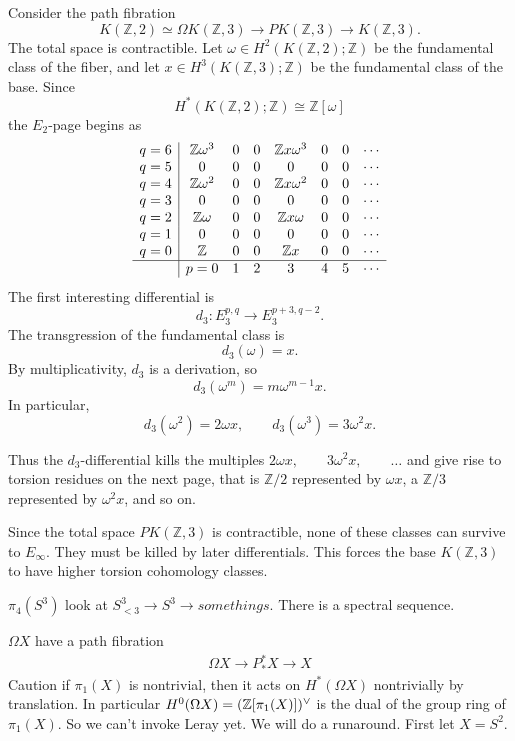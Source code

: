 \documentclass[12pt]{article}
\begin{document}
\begin{example}
Consider the path fibration
\[
K(\mathbb Z,2)\simeq \Omega K(\mathbb Z,3)
\longrightarrow
PK(\mathbb Z,3)
\longrightarrow
K(\mathbb Z,3).
\]
The total space is contractible. Let $\omega\in H^2(K(\mathbb Z,2);\mathbb Z)$
be the fundamental class of the fiber, and let $x\in H^3(K(\mathbb Z,3);\mathbb Z)$
be the fundamental class of the base. Since
\[
H^*(K(\mathbb Z,2);\mathbb Z)\cong \mathbb Z[\omega]
\]
the $E_2$-page begins as
\[
\begin{array}{c|ccccccc}
q=6 & \mathbb Z\omega^3 & 0 & 0 & \mathbb Zx\omega^3 & 0 & 0 & \cdots \\
q=5 & 0 & 0 & 0 & 0 & 0 & 0 & \cdots \\
q=4 & \mathbb Z\omega^2 & 0 & 0 & \mathbb Zx\omega^2 & 0 & 0 & \cdots \\
q=3 & 0 & 0 & 0 & 0 & 0 & 0 & \cdots \\
q=2 & \mathbb Z\omega & 0 & 0 & \mathbb Zx\omega & 0 & 0 & \cdots \\
q=1 & 0 & 0 & 0 & 0 & 0 & 0 & \cdots \\
q=0 & \mathbb Z & 0 & 0 & \mathbb Zx & 0 & 0 & \cdots \\
\hline
& p=0 & 1 & 2 & 3 & 4 & 5 & \cdots
\end{array}
\]
The first interesting differential is
\[
d_3:E_3^{p,q}\to E_3^{p+3,q-2}.
\]
The transgression of the fundamental class is
\[
d_3(\omega)=x.
\]
By multiplicativity, $d_3$ is a derivation, so
\[
d_3(\omega^m)=m\omega^{m-1}x.
\]
In particular,
\[
d_3(\omega^2)=2\omega x,
\qquad
d_3(\omega^3)=3\omega^2x.
\]

Thus the $d_3$-differential kills the multiples $2\omega x,\qquad 3\omega^2x,\qquad \dots$ and give rise to torsion residues on the next page, that is $\mathbb Z/2$ represented by $\omega x$, a $\mathbb Z/3$ represented by $\omega^2x$, and so on.

Since the total space $PK(\mathbb Z,3)$ is contractible, none of these classes can survive to $E_\infty$. They must be killed by later differentials. This forces the base $K(\mathbb Z,3)$
to have higher torsion cohomology classes. 
\end{example}

    $\pi_4(S^3)$ look at $S^3_{<3} \to S^3 \to somethings $. There is a spectral sequence.

    $\Omega X$ have a path fibration \begin{align*}
        \Omega X \to P^*_*X \to X
    \end{align*}
    Caution if $\pi_1(X)$ is nontrivial, then it acts on $H^*(\Omega X)$ nontrivially by translation. In particular $H^0(\Omega X) = (\mathbb{Z}[\pi_1(X)])^\vee$ is the dual of the group ring of $\pi_1(X)$. So we can't invoke Leray yet. We will do a runaround. First let $X = S^2$.
\end{document}
